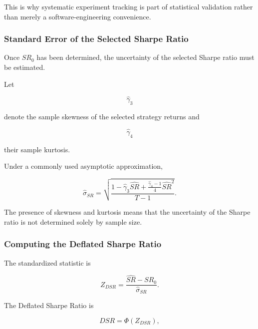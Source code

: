 \documentclass[11pt,a4paper]{article}
\begin{document}
This is why systematic experiment tracking is part of statistical validation
rather than merely a software-engineering convenience.


\subsubsection{Standard Error of the Selected Sharpe Ratio}

Once $SR_0$ has been determined, the uncertainty of the selected Sharpe ratio
must be estimated.

Let

\begin{equation}
\widehat{\gamma}_3
\end{equation}

denote the sample skewness of the selected strategy returns and

\begin{equation}
\widehat{\gamma}_4
\end{equation}

their sample kurtosis.

Under a commonly used asymptotic approximation,

\begin{equation}
\boxed{
\widehat{\sigma}_{SR}
=
\sqrt{
\frac{
1
-
\widehat{\gamma}_3
\widehat{SR}
+
\frac{
\widehat{\gamma}_4-1
}{4}
\widehat{SR}^{2}
}{
T-1
}
}.
}
\end{equation}

The presence of skewness and kurtosis means that the uncertainty of the Sharpe
ratio is not determined solely by sample size.


\subsubsection{Computing the Deflated Sharpe Ratio}

The standardized statistic is

\begin{equation}
\boxed{
Z_{DSR}
=
\frac{
\widehat{SR}-SR_0
}{
\widehat{\sigma}_{SR}
}.
}
\end{equation}

The Deflated Sharpe Ratio is

\begin{equation}
\boxed{
DSR
=
\Phi
\left(
Z_{DSR}
\right),
}
\end{equation}
\end{document}
